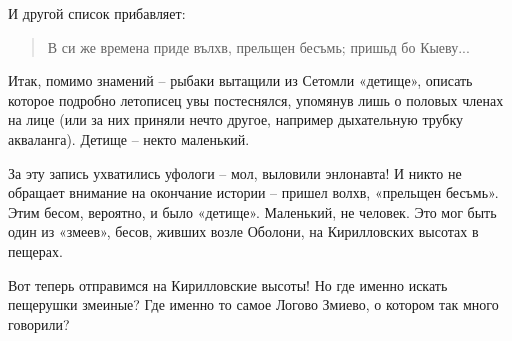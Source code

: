 И другой список прибавляет:

\begin{quotation}
В си же времена приде вълхв, прельщен бесъмь; пришьд бо Кыеву...
\end{quotation}

Итак, помимо знамений – рыбаки вытащили из Сетомли «детище», описать которое подробно летописец увы постеснялся, упомянув лишь о половых членах на лице (или за них приняли нечто другое, например дыхательную трубку акваланга). Детище – некто маленький.

За эту запись ухватились уфологи – мол, выловили энлонавта! И никто не обращает внимание на окончание истории – пришел волхв, «прельщен бесъмь». Этим бесом, вероятно, и было «детище». Маленький, не человек. Это мог быть один из «змеев», бесов, живших возле Оболони, на Кирилловских высотах в пещерах.

Вот теперь отправимся на Кирилловские высоты! Но где именно искать пещерушки змеиные? Где именно то самое Логово Змиево, о котором так много говорили?

